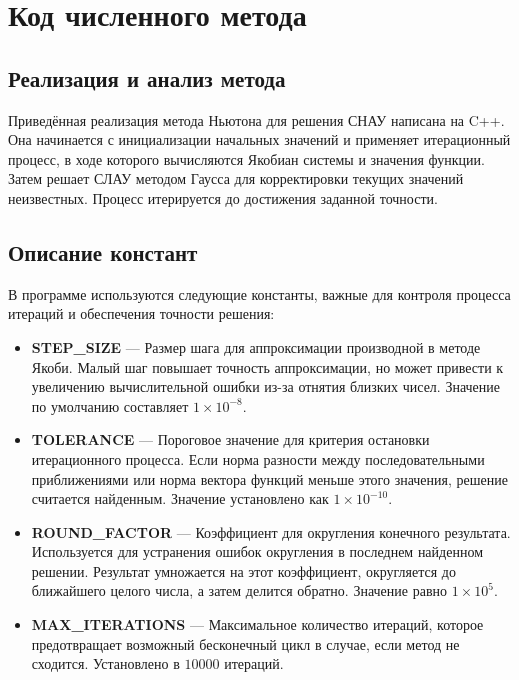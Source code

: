 \newpage
\section{Код численного метода}

\subsection{Реализация и анализ метода}
Приведённая реализация метода Ньютона для решения СНАУ написана на C++. Она начинается с инициализации начальных значений и применяет итерационный процесс, в ходе которого вычисляются Якобиан системы и значения функции. Затем решает СЛАУ методом Гаусса для корректировки текущих значений неизвестных. Процесс итерируется до достижения заданной точности.

\subsection{Описание констант}
В программе используются следующие константы, важные для контроля процесса итераций и обеспечения точности решения:

\begin{itemize}
    \item \textbf{STEP\_SIZE} — Размер шага для аппроксимации производной в методе Якоби. Малый шаг повышает точность аппроксимации, но может привести к увеличению вычислительной ошибки из-за отнятия близких чисел. Значение по умолчанию составляет \( 1 \times 10^{-8} \).

    \item \textbf{TOLERANCE} — Пороговое значение для критерия остановки итерационного процесса. Если норма разности между последовательными приближениями или норма вектора функций меньше этого значения, решение считается найденным. Значение установлено как \( 1 \times 10^{-10} \).

    \item \textbf{ROUND\_FACTOR} — Коэффициент для округления конечного результата. Используется для устранения ошибок округления в последнем найденном решении. Результат умножается на этот коэффициент, округляется до ближайшего целого числа, а затем делится обратно. Значение равно \( 1 \times 10^{5} \).

    \item \textbf{MAX\_ITERATIONS} — Максимальное количество итераций, которое предотвращает возможный бесконечный цикл в случае, если метод не сходится. Установлено в \( 10000 \) итераций.
\end{itemize}


